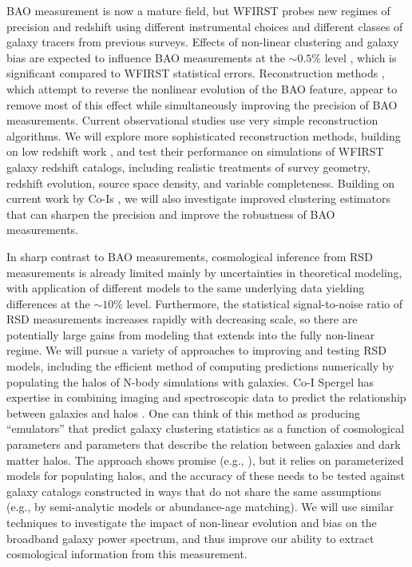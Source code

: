 BAO measurement is now a mature field, but WFIRST probes new regimes
of precision and redshift using different instrumental choices
and different classes of galaxy tracers from previous surveys.
Effects of non-linear clustering and galaxy bias are expected to
influence BAO measurements at the $\sim 0.5\%$ level \cite{Padmanabhan2009}, which is
significant compared to WFIRST statistical errors.
Reconstruction methods \cite{Eisenstein2007,Padmanabhan2012,Vargas2015}, 
which attempt to reverse the
nonlinear evolution of the BAO feature, appear to remove
most of this effect while simultaneously improving the precision
of BAO measurements.  Current observational studies use very simple
reconstruction algorithms.  We will explore more sophisticated
reconstruction methods, building on low redshift work \cite{Carrick15}, and test their performance on simulations
of WFIRST galaxy redshift catalogs, including realistic treatments of
survey geometry, redshift evolution, source space density, and
variable completeness.  Building on current work by Co-Is
\cite{Padmanabhan2012,Vargas2015,Osumi2015,Zhu2015}, 
we will also investigate improved clustering estimators that can sharpen the precision and improve the robustness
of BAO measurements.

In sharp contrast to BAO measurements, cosmological inference from 
RSD measurements is already limited mainly by uncertainties in 
theoretical modeling, with application of different models to the
same underlying data yielding differences at the $\sim 10\%$ level.
Furthermore, the statistical signal-to-noise ratio of RSD measurements
increases rapidly with decreasing scale, so there are potentially
large gains from modeling that extends into the fully non-linear regime.
We will pursue a variety of approaches to improving and testing
RSD models, including the 
efficient method of computing predictions
numerically by populating the halos of N-body simulations with galaxies. 
Co-I Spergel has expertise in combining imaging and spectroscopic 
data to predict the relationship between galaxies and halos \cite{Hikage2012}.
One can think of this method as producing ``emulators'' \cite{Heitmann2014}
that predict galaxy clustering statistics as a function 
of cosmological parameters and parameters that describe the relation
between galaxies and dark matter halos.
The approach shows promise (e.g., \cite{Reid2014}),
but it relies on parameterized models for populating halos,
and the accuracy of these needs to be tested against galaxy catalogs
constructed in ways that do not share the same assumptions
(e.g., by semi-analytic models or abundance-age matching).
We will use similar techniques to investigate the impact of
non-linear evolution and bias on the broadband galaxy power
spectrum, and thus improve our ability to extract cosmological
information from this measurement.


